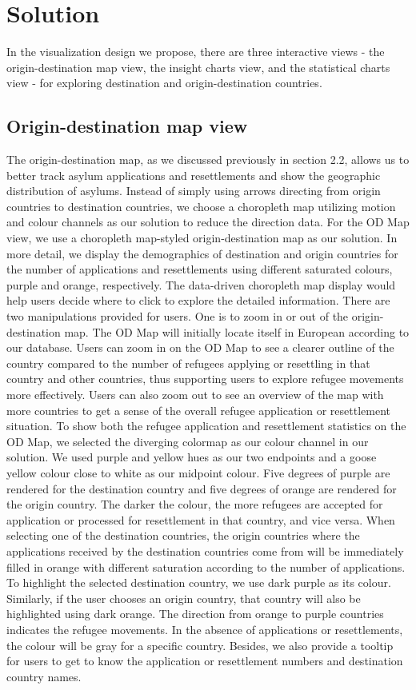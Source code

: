 \documentclass[journal]{vgtc}                %
\begin{document}
 \section{Solution}

 In the visualization design we propose, there are three interactive views - the origin-destination map view, the insight charts view, and the statistical charts view - for exploring destination and origin-destination countries.
 
 \subsection{Origin-destination map view}
 The origin-destination map, as we discussed previously in section 2.2, allows us to better track asylum applications and resettlements and show the geographic distribution of asylums. Instead of simply using arrows directing from origin countries to destination countries, we choose a choropleth map utilizing motion and colour channels as our solution to reduce the direction data.
 For the OD Map view, we use a choropleth map-styled origin-destination map as our solution. In more detail, we display the demographics of destination and origin countries for the number of applications and resettlements using different saturated colours, purple and orange, respectively. The data-driven choropleth map display would help users decide where to click to explore the detailed information.
 There are two manipulations provided for users. One is to zoom in or out of the origin-destination map. The OD Map will initially locate itself in European according to our database. Users can zoom in on the OD Map to see a clearer outline of the country compared to the number of refugees applying or resettling in that country and other countries, thus supporting users to explore refugee movements more effectively. Users can also zoom out to see an overview of the map with more countries to get a sense of the overall refugee application or resettlement situation.
 To show both the refugee application and resettlement statistics on the OD Map, we selected the diverging colormap as our colour channel in our solution. We used purple and yellow hues as our two endpoints and a goose yellow colour close to white as our midpoint colour. Five degrees of purple are rendered for the destination country and five degrees of orange are rendered for the origin country. The darker the colour, the more refugees are accepted for application or processed for resettlement in that country, and vice versa. When selecting one of the destination countries, the origin countries where the applications received by the destination countries come from will be immediately filled in orange with different saturation according to the number of applications.
 To highlight the selected destination country, we use dark purple as its colour. Similarly, if the user chooses an origin country, that country will also be highlighted using dark orange. The direction from orange to purple countries indicates the refugee movements. In the absence of applications or resettlements, the colour will be gray for a specific country. Besides, we also provide a tooltip for users to get to know the application or resettlement numbers and destination country names.
\end{document}

